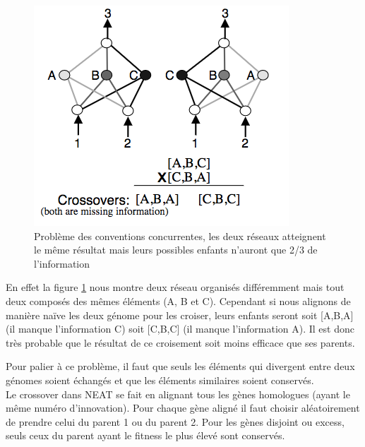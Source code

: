 \documentclass{article}
\begin{document}
\begin{figure}[H]
\begin{center}
	\includegraphics[scale=0.7]{competingconventions.png}
	\caption{Problème des conventions concurrentes, les deux réseaux atteignent le même résultat mais leurs possibles enfants n'auront que 2/3 de l'information \cite{neatpaper}}
	\label{fig:competing}
\end{center}
\end{figure}

En effet la figure \ref{fig:competing} nous montre deux réseau organisés différemment mais tout deux composés des mêmes éléments (A, B et C). Cependant si nous alignons de manière naïve les deux génome pour les croiser, leurs enfants seront soit [A,B,A] (il manque l'information C) soit [C,B,C] (il manque l'information A). Il est donc très probable que le résultat de ce croisement soit moins efficace que ses parents. 

Pour palier à ce problème, il faut que seuls les éléments qui divergent entre deux génomes soient échangés et que les éléments similaires soient conservés.\\

Le crossover dans NEAT se fait en alignant tous les gènes homologues (ayant le même numéro d'innovation). Pour chaque gène aligné il faut choisir aléatoirement de prendre celui du parent 1 ou du parent 2. Pour les gènes disjoint ou excess, seuls ceux du parent ayant le fitness le plus élevé sont conservés.
\end{document}
